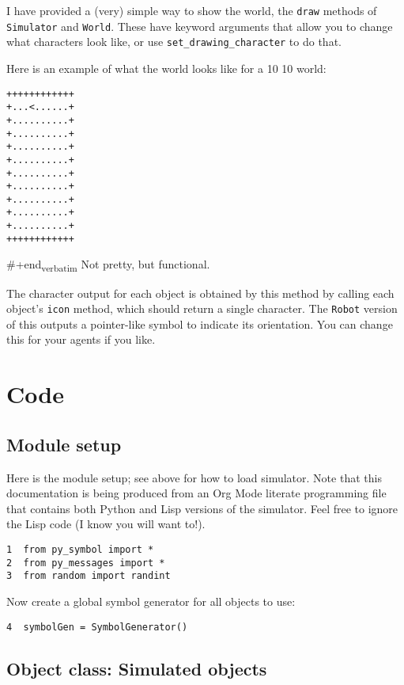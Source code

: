 \documentclass[11pt]{tufte-handout}
\begin{document}
I have provided a (very) simple way to show the world, the \texttt{draw} methods of \texttt{Simulator} and \texttt{World}. These have keyword arguments that allow you to change what characters look like, or use \texttt{set\_drawing\_character} to do that.

Here is an example of what the world looks like for a 10 \texttimes{} 10 world:
\begin{verbatim}
++++++++++++
+...<......+
+..........+
+..........+
+..........+
+..........+
+..........+
+..........+
+..........+
+..........+
+..........+
++++++++++++
\end{verbatim}

\#+end\textsubscript{verbatim}
\noident Not pretty, but functional.

The character output for each object is obtained by this method by calling each object's \texttt{icon} method, which should return a single character.  The \texttt{Robot} version of this outputs a pointer-like symbol to indicate its orientation.  You can change this for your agents if you like.

\section{Code}
\label{sec:orgc254c81}
\label{org3976db7}

\subsection{Module setup}
\label{sec:org214342c}

Here is the module setup; see above for how to load simulator.  Note that this documentation is being produced from an Org Mode literate programming file that contains both Python and Lisp versions of the simulator.  Feel free to ignore the Lisp code (I know you will want to!).

\begin{verbatim}
1  from py_symbol import *
2  from py_messages import *
3  from random import randint
\end{verbatim}

Now create a global symbol generator for all objects to use:
\begin{verbatim}
4  symbolGen = SymbolGenerator()
\end{verbatim}

\subsection{Object class: Simulated objects}
\label{sec:orgc7d6c1e}
\end{document}
